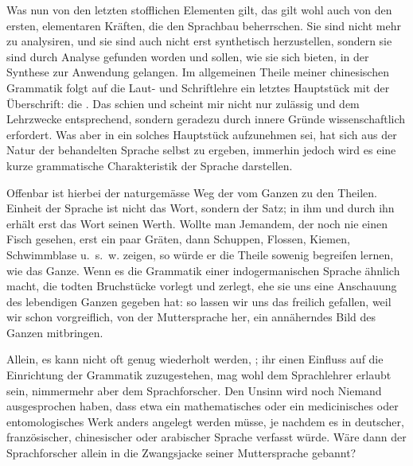 Was nun von den letzten stofflichen Elementen gilt, das gilt wohl auch von den ersten, elementaren Kräften, die den Sprachbau beherrschen. Sie sind nicht mehr zu analysiren, und sie sind auch nicht erst synthetisch herzustellen, sondern sie sind durch Analyse gefunden worden und sollen, wie sie sich bieten, in der Synthese zur Anwendung gelangen. Im allgemeinen Theile meiner chinesischen Grammatik folgt auf die Laut- und Schriftlehre ein letztes Hauptstück mit der Überschrift: die . Das schien und scheint mir nicht nur zulässig und dem Lehrzwecke entsprechend, sondern \label{sp.88} geradezu durch innere Gründe wissenschaftlich erfordert. Was aber in ein solches Hauptstück aufzunehmen sei, hat sich aus der Natur der behandelten Sprache \label{fp.90} selbst zu ergeben, immerhin jedoch wird es eine kurze grammatische Charakteristik der Sprache darstellen.


Offenbar ist hierbei der naturgemässe Weg  der vom Ganzen zu den Theilen.   Einheit der Sprache ist nicht das Wort, sondern der Satz; in ihm und durch ihn erhält erst das Wort seinen Werth. Wollte man Jemandem, der noch nie einen Fisch gesehen, erst ein paar Gräten, dann Schuppen, Flossen, Kiemen, Schwimmblase u.~s.~w. zeigen, so würde er die Theile sowenig begreifen lernen, wie das Ganze. Wenn es die Grammatik einer indogermanischen Sprache ähnlich macht, die todten Bruchstücke vorlegt und zerlegt, ehe sie uns eine Anschauung des lebendigen Ganzen gegeben hat: so lassen wir uns das freilich gefallen, weil wir schon vorgreiflich, von der Muttersprache her, ein annäherndes Bild des Ganzen mitbringen.

Allein, es kann nicht oft genug wiederholt werden, ; ihr einen Einfluss auf die Einrichtung der Grammatik zuzugestehen, mag wohl dem Sprachlehrer erlaubt sein, nimmermehr aber dem Sprachforscher. Den Unsinn wird noch Niemand ausgesprochen haben, dass etwa ein mathematisches oder ein medicinisches oder entomologisches Werk anders angelegt werden müsse, je nachdem es in deutscher, französischer, chinesischer oder arabischer Sprache verfasst würde. Wäre dann der Sprachforscher allein in die Zwangsjacke seiner Muttersprache gebannt?

